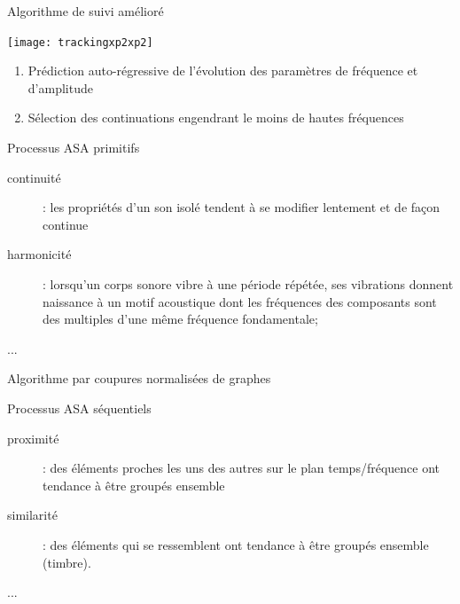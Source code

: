 \begin{frame}{Algorithme de suivi amélioré}
\begin{center}
  \texttt{[image: trackingxp2xp2]}
\end{center}
  \begin{enumerate}
      \item Prédiction auto-régressive de l'évolution des paramètres de fréquence et d'amplitude
      \item Sélection des continuations engendrant le moins de hautes fréquences
  \end{enumerate}
\end{frame}

\begin{frame}{Processus ASA \og primitifs \fg}
\begin{description}
\item[\alert{continuité}] : les propriétés d'un son isolé tendent à se modifier lentement et de façon continue
\item[\alert{harmonicité}] : lorsqu'un corps sonore vibre à une période répétée, ses vibrations donnent naissance à un motif acoustique dont les fréquences des composants sont des multiples d'une même fréquence fondamentale;
\item[...]
\end{description}
\end{frame}
 
\begin{frame}{Algorithme par coupures normalisées de graphes}
\begin{center}
\end{center}
\end{frame}



\begin{frame}{Processus ASA \og séquentiels \fg}
\begin{description}
\item[proximité] : des éléments proches les uns des autres sur le plan temps/fréquence ont tendance à être groupés ensemble
\item[similarité] : des éléments qui se ressemblent ont tendance à être groupés ensemble (timbre). 
\item[...]
\end{description}
\end{frame}

